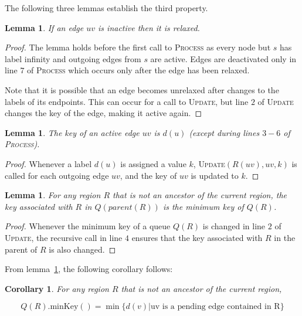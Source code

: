 \documentclass[11pt]{article}
\newtheorem{corollary}{Corollary}[theorem]
\newtheorem{lemma}[theorem]{Lemma}
\begin{document}
The following three lemmas establish the third property.\\

\begin{lemma}
  If an edge $uv$ is inactive then it is relaxed.
\end{lemma}

\begin{proof}
  The lemma holds before the first call to \textsc{Process} as every node but $s$ has label infinity and outgoing edges from $s$ are active. Edges are deactivated only in line $7$ of \textsc{Process} which occurs only after the edge has been relaxed.

  Note that it is possible that an edge becomes unrelaxed after changes to the labels of its endpoints. This can occur for a call to \textsc{Update}, but line $2$ of \textsc{Update} changes the key of the edge, making it active again.
\end{proof}

\begin{lemma}
  The key of an active edge $uv$ is $d(u)$ (except during lines $3-6$ of \textsc{Process}).
\end{lemma}

\begin{proof}
  Whenever a label $d(u)$ is assigned a value $k$, \textsc{Update}$(R(uv),uv,k)$ is called for each outgoing edge $uv$, and the key of $uv$ is updated to $k$.
\end{proof}

\begin{lemma}
  \label{lemma:invariant}
  For any region $R$ that is not an ancestor of the current region, the key associated with $R$ in $Q(parent(R))$ is the minimum key of $Q(R)$.
\end{lemma}

\begin{proof}
  Whenever the minimum key of a queue $Q(R)$ is changed in line $2$ of \textsc{Update}, the recursive call in line $4$ ensures that the key associated with $R$ in the parent of $R$ is also changed.
\end{proof}

From lemma~\ref{lemma:invariant}, the following corollary follows:\\

\begin{corollary}
\label{cor:relaxed}
  For any region $R$ that is not an ancestor of the current region,

  \[
    Q(R).\text{minKey}() = \min \{ d(v) | \text{uv is a pending edge contained in R} \}
  \]
\end{corollary}
\end{document}
